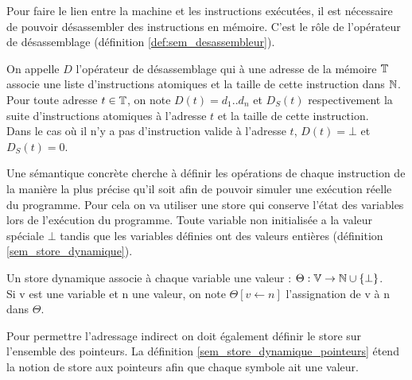 
% 

Pour faire le lien entre la machine et les instructions exécutées, il est nécessaire de pouvoir désassembler des instructions en mémoire. C'est le rôle de l'opérateur de désassemblage (définition \ref{def:sem_desassembleur}).

\begin{defi}
On appelle $D$ l'opérateur de désassemblage qui à une adresse de la mémoire $\mathbb T$ associe une liste d'instructions atomiques et la taille de cette instruction dans $\mathbb N$. \\
Pour toute adresse $t\in\mathbb T$, on note $D(t)=d_1..d_n$ et $D_S(t)$ respectivement la suite d'instructions atomiques à l'adresse $t$ et la taille de cette instruction.\\
Dans le cas où il n'y a pas d'instruction valide à l'adresse $t$, $D(t)=\bot$ et $D_S(t)=0$.
\label{def:sem_desassembleur}
\end{defi}

Une sémantique concrète cherche à définir les opérations de chaque instruction de la manière la plus précise qu'il soit afin de pouvoir simuler une exécution réelle du programme.
Pour cela on va utiliser une store qui conserve l'état des variables lors de l'exécution du programme.
Toute variable non initialisée a la valeur spéciale $\bot$ tandis que les variables définies ont des valeurs entières (définition \ref{sem_store_dynamique}).

\begin{defi}
 Un store dynamique associe à chaque variable une valeur : $\Theta:\mathbb V\rightarrow\mathbb N\cup\{\bot\}$.\\
 Si v est une variable et n une valeur, on note $\Theta[v\leftarrow n]$ l'assignation de v à n dans $\Theta$.
\label{sem_store_dynamique}
\end{defi}

Pour permettre l'adressage indirect on doit également définir le store sur l'ensemble des pointeurs.
La définition \ref{sem_store_dynamique_pointeurs} étend la notion de store aux pointeurs afin que chaque symbole ait une valeur.


